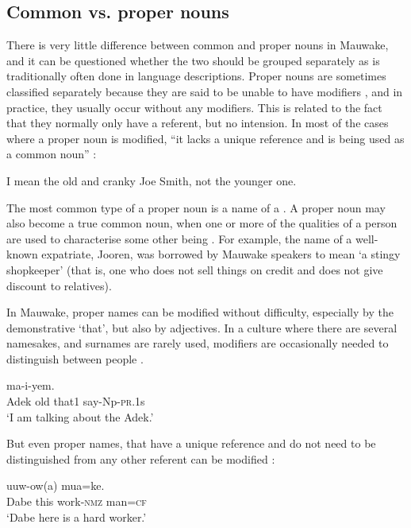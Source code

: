 \subsection{Common vs. proper nouns}\label{sec:3:2:3}
{}
There is very little difference between common and proper nouns in Mauwake, and it can be questioned whether the two should be grouped separately as is traditionally often done in language descriptions. Proper nouns are sometimes classified separately because they are said to be unable to have modifiers \citep[152]{Roberts1987}, and in practice, they usually occur without any modifiers. This is related to the fact that they normally only have a referent, but no intension. In most of the cases where a proper noun is modified, ``it lacks a unique reference and is being used as a common noun'' \citep[59]{VanValinEtAl1997}:

\ea
  I mean the old and cranky Joe Smith, not the younger one. 
\z

The most common type of a proper noun is a name of a . A proper noun may also become a true common noun, when one or more of the qualities of a person are used to characterise some other being \citep[66]{Jespersen1924}. For example, the name of a well-known expatriate, Jooren, was borrowed by Mauwake speakers to mean `a stingy shopkeeper' (that is, one who does not sell things on credit and does not give discount to relatives). 

In Mauwake, proper names can be modified without difficulty, especially by the demonstrative  `that', but also by adjectives. In a culture where there are several namesakes, and surnames are rarely used, modifiers are occasionally needed to distinguish between people .

\ea%
\label{ex:3:x27}
\gll {}   ma-i-yem. \\
Adek old that1 say-Np-\textsc{pr}.1s\\
\glt`I am talking about the  Adek.'
\z

But even proper names, that have a unique reference and do not need to be distinguished from any other referent can be modified :

\ea%
\label{ex:3:x106}
\gll {}  uuw-ow(a) mua=ke. \\
Dabe this work-\textsc{nmz} man=\textsc{cf}\\
\glt`Dabe here is a hard worker.'
\z


